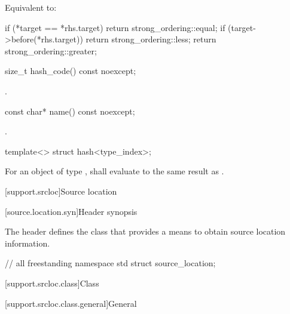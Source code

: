 \begin{itemdescr}
\pnum
\effects
Equivalent to:
\begin{codeblock}
if (*target == *rhs.target) return strong_ordering::equal;
if (target->before(*rhs.target)) return strong_ordering::less;
return strong_ordering::greater;
\end{codeblock}
\end{itemdescr}

%
\begin{itemdecl}
size_t hash_code() const noexcept;
\end{itemdecl}

\begin{itemdescr}
\pnum
\returns
{}.
\end{itemdescr}

%
\begin{itemdecl}
const char* name() const noexcept;
\end{itemdecl}

\begin{itemdescr}
\pnum
\returns
{}.
\end{itemdescr}

%
\begin{itemdecl}
template<> struct hash<type_index>;
\end{itemdecl}

\begin{itemdescr}
\pnum
For an object  of type ,
 shall evaluate to the same result as .
\end{itemdescr}

[support.srcloc]{Source location}

[source.location.syn]{Header  synopsis}

\pnum
The header  defines
the class 
that provides a means to obtain source location information.

\begin{codeblock}
// all freestanding
namespace std {
  struct source_location;
}
\end{codeblock}

[support.srcloc.class]{Class }

[support.srcloc.class.general]{General}

